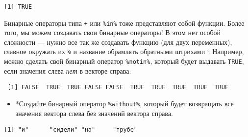 \documentclass[
]{book}
\newenvironment{Shaded}{\begin{snugshade}}{\end{snugshade}}
\newcommand{\ControlFlowTok}[1]{\textcolor[rgb]{0.13,0.29,0.53}{\textbf{#1}}}
\newcommand{\DataTypeTok}[1]{\textcolor[rgb]{0.13,0.29,0.53}{#1}}
\newcommand{\DecValTok}[1]{\textcolor[rgb]{0.00,0.00,0.81}{#1}}
\newcommand{\KeywordTok}[1]{\textcolor[rgb]{0.13,0.29,0.53}{\textbf{#1}}}
\newcommand{\NormalTok}[1]{#1}
\newcommand{\OperatorTok}[1]{\textcolor[rgb]{0.81,0.36,0.00}{\textbf{#1}}}
\newcommand{\StringTok}[1]{\textcolor[rgb]{0.31,0.60,0.02}{#1}}
\providecommand{\tightlist}{%
  \setlength{\itemsep}{0pt}\setlength{\parskip}{0pt}}
\begin{document}
\begin{verbatim}
[1] TRUE
\end{verbatim}

Бинарные операторы типа \texttt{+} или \texttt{\%in\%} тоже представляют собой функции. Более того, мы можем создавать свои бинарные операторы! В этом нет особой сложности --- нужно все так же создавать функцию (для двух переменных), главное окружать их \texttt{\%} и название обрамлять обратными штрихами `. Например, можно сделать свой бинарный оператор \texttt{\%notin\%}, который будет выдавать \texttt{TRUE}, если значения слева \emph{нет} в векторе справа:

\begin{Shaded}
\end{Shaded}

\begin{verbatim}
 [1] FALSE  TRUE  TRUE FALSE FALSE  TRUE  TRUE  TRUE  TRUE  TRUE
\end{verbatim}

\begin{itemize}
\tightlist
\item
  *Создайте бинарный оператор \texttt{\%without\%}, который будет возвращать все значения вектора слева без значений вектора справа.
\end{itemize}

\begin{Shaded}
\end{Shaded}

\begin{verbatim}
[1] "и"      "сидели" "на"     "трубе" 
\end{verbatim}
\end{document}
